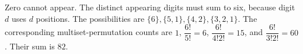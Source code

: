 Zero cannot appear. The distinct appearing digits must sum to six, because digit $d$ uses $d$ positions. The possibilities are $\{6\},\{5,1\},\{4,2\},\{3,2,1\}$. The corresponding multiset-permutation counts are $1$, $\dfrac{6!}{5!}=6$, $\dfrac{6!}{4!2!}=15$, and $\dfrac{6!}{3!2!}=60$. Their sum is $\boxed{82}$.
